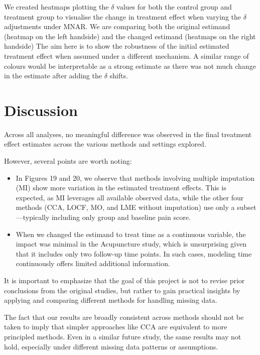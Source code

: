 \documentclass{article}
\begin{document}
We created heatmaps plotting the \(\delta\) values for both the control
group and treatment group to visualise the change in treatment effect
when varying the \(\delta\) adjustments under MNAR. We are comparing
both the original estimand (heatmap on the left handside) and the
changed estimand (heatmaps on the right handside) The aim here is to
show the robustness of the initial estimated treatment effect when
assumed under a different mechanism. A similar range of colours would be
interpretable as a strong estimate as there was not much change in the
estimate after adding the \(\delta\) shifts.

\section{Discussion}\label{discussion}

Across all analyses, no meaningful difference was observed in the final
treatment effect estimates across the various methods and settings
explored.

However, several points are worth noting:

\begin{itemize}
\item
  In Figures 19 and 20, we observe that methods involving multiple
  imputation (MI) show more variation in the estimated treatment
  effects. This is expected, as MI leverages all available observed
  data, while the other four methods (CCA, LOCF, MO, and LME without
  imputation) use only a subset---typically including only group and
  baseline pain score.
\item
  When we changed the estimand to treat time as a continuous variable,
  the impact was minimal in the Acupuncture study, which is unsurprising
  given that it includes only two follow-up time points. In such cases,
  modeling time continuously offers limited additional information.
\end{itemize}

It is important to emphasize that the goal of this project is not to
revise prior conclusions from the original studies, but rather to gain
practical insights by applying and comparing different methods for
handling missing data.

The fact that our results are broadly consistent across methods should
not be taken to imply that simpler approaches like CCA are equivalent to
more principled methods. Even in a similar future study, the same
results may not hold, especially under different missing data patterns
or assumptions.
\end{document}
